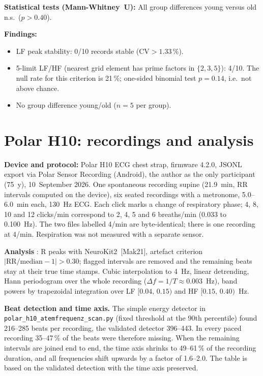 \textbf{Statistical tests (Mann-Whitney~U):} All group differences young
versus old n.s.\ ($p>0.40$).

\textbf{Findings:}
\begin{itemize}
\item LF peak stability: 0/10 records stable ($\text{CV}>1.33\,\%$).
\item 5-limit LF/HF (nearest grid element has prime factors in
  $\{2,3,5\}$): 4/10. The null rate for this criterion is 21\,\%;
  one-sided binomial test $p=0.14$, i.e.\ not above chance.
\item No group difference young/old ($n=5$ per group).
\end{itemize}

\section{Polar H10: recordings and analysis}

\textbf{Device and protocol:} Polar H10 ECG chest strap, firmware 4.2.0,
JSONL export via Polar Sensor Recording (Android), the author as the only
participant (75~y), 10~September 2026. One spontaneous recording supine
(21.9~min, RR intervals computed on the device), six seated recordings
with a metronome, 5.0--6.0~min each, 130~Hz ECG. Each click marks a change
of respiratory phase; 4, 8, 10 and 12 clicks/min correspond to 2, 4, 5 and
6 breaths/min (0.033 to 0.100~Hz). The two files labelled 4/min are
byte-identical; there is one recording at 4/min. Respiration was not
measured with a separate sensor.

\textbf{Analysis} \KM: R peaks with NeuroKit2 \LM\,[Mak21], artefact
criterion $|\text{RR}/\text{median}-1|>0.30$; flagged intervals are
removed and the remaining beats stay at their true time stamps. Cubic
interpolation to 4~Hz, linear detrending, Hann periodogram over the whole
recording ($\Delta f=1/T\approx0.003$~Hz), band powers by trapezoidal
integration over LF $[0.04,\,0.15)$ and HF $[0.15,\,0.40)$~Hz.

\textbf{Beat detection and time axis.} The simple energy detector in
\texttt{polar\_h10\_atemfrequenz\_scan.py} (fixed threshold at the
90th percentile) found 216--285 beats per recording, the validated
detector 396--443. In every paced recording 35--47\,\% of the beats were
therefore missing. When the remaining intervals are joined end to end,
the time axis shrinks to 49--61\,\% of the recording duration, and all
frequencies shift upwards by a factor of 1.6--2.0. The table is based on
the validated detection with the time axis preserved.

